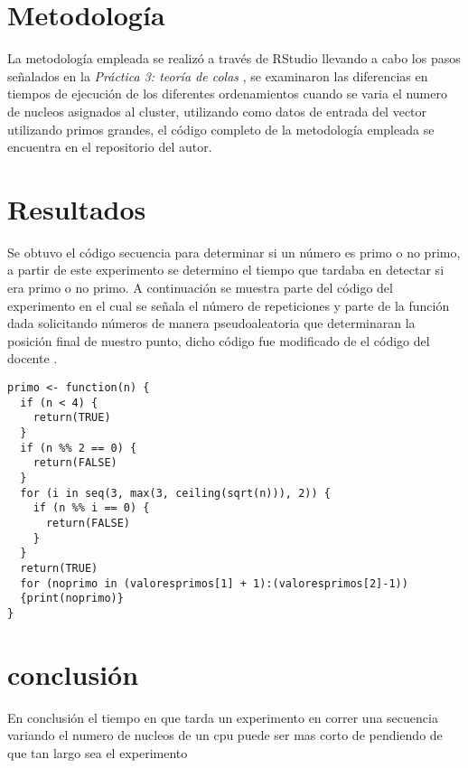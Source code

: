 \documentclass[a4paper]{article}
\begin{document}
\section{Metodología}
\justify
La metodología empleada se realizó a través de RStudio\cite{RStudio} llevando a cabo los pasos señalados en la \textit{Práctica 3: teoría de colas} \cite{p3}, se examinaron las diferencias en tiempos de ejecución de los diferentes ordenamientos cuando se varia el numero de nucleos asignados al cluster, utilizando como datos de entrada del vector utilizando primos grandes, el código completo de la metodología empleada se encuentra en el repositorio \cite{gitadrian} del autor.


\section{Resultados}
\justify
Se obtuvo el código secuencia para determinar si un número es primo o no primo, a partir de este experimento se determino el tiempo que tardaba en detectar si era primo o no primo. A continuación se muestra parte del código del experimento \cite{gitadrian} en el cual se señala el número de repeticiones y parte de la función dada solicitando números de manera pseudoaleatoria que determinaran la posición final de nuestro punto, dicho código fue modificado de el código del docente \cite{p3gitdr}. 
\begin{lstlisting}
primo <- function(n) {
  if (n < 4) {
    return(TRUE)
  }
  if (n %% 2 == 0) {
    return(FALSE)
  }
  for (i in seq(3, max(3, ceiling(sqrt(n))), 2)) {
    if (n %% i == 0) {
      return(FALSE)
    }
  }
  return(TRUE)
  for (noprimo in (valoresprimos[1] + 1):(valoresprimos[2]-1))
  {print(noprimo)}
}
\end{lstlisting}
\section{conclusión}
\justify En conclusión el tiempo en que tarda un experimento en correr una secuencia variando el numero de nucleos de un cpu puede ser mas corto de pendiendo de que tan largo sea el experimento

\clearpage
\end{document}
